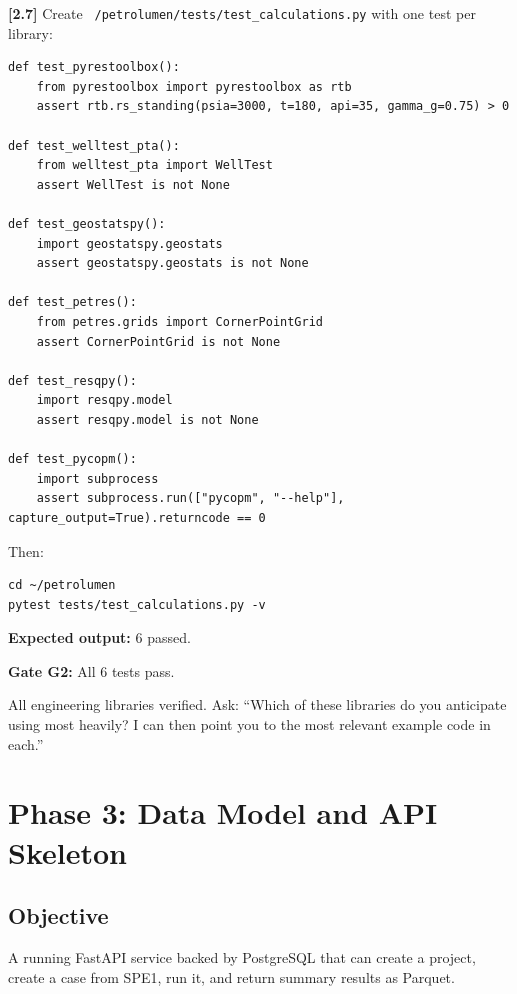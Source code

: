 \documentclass[10pt,a4paper]{article}
\newcommand{\stepID}[1]{\textsf{\textbf{[#1]}}}
\newcommand{\file}[1]{\texttt{#1}}
\begin{document}
\stepID{2.7} Create \file{~/petrolumen/tests/test\_calculations.py} with one test per library:

\begin{lstlisting}[caption={tests/test\_calculations.py}]
def test_pyrestoolbox():
    from pyrestoolbox import pyrestoolbox as rtb
    assert rtb.rs_standing(psia=3000, t=180, api=35, gamma_g=0.75) > 0

def test_welltest_pta():
    from welltest_pta import WellTest
    assert WellTest is not None

def test_geostatspy():
    import geostatspy.geostats
    assert geostatspy.geostats is not None

def test_petres():
    from petres.grids import CornerPointGrid
    assert CornerPointGrid is not None

def test_resqpy():
    import resqpy.model
    assert resqpy.model is not None

def test_pycopm():
    import subprocess
    assert subprocess.run(["pycopm", "--help"], capture_output=True).returncode == 0
\end{lstlisting}

Then:
\begin{lstlisting}[style=sh]
cd ~/petrolumen
pytest tests/test_calculations.py -v
\end{lstlisting}

\textbf{Expected output:} 6 passed.

\begin{gate}
\textbf{Gate G2:} All 6 tests pass.
\end{gate}

\begin{aicheckpoint}
All engineering libraries verified. Ask: ``Which of these libraries do you anticipate using most heavily? I can then point you to the most relevant example code in each.''
\end{aicheckpoint}

\section{Phase 3: Data Model and API Skeleton}
\label{sec:phase3}

\subsection{Objective}
A running FastAPI service backed by PostgreSQL that can create a project, create a case from SPE1, run it, and return summary results as Parquet.
\end{document}
